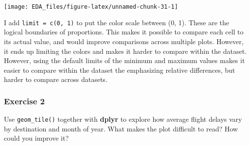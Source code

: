 \documentclass[]{book}
\newenvironment{Shaded}{\begin{snugshade}}{\end{snugshade}}
\newcommand{\DataTypeTok}[1]{\textcolor[rgb]{0.13,0.29,0.53}{#1}}
\newcommand{\DecValTok}[1]{\textcolor[rgb]{0.00,0.00,0.81}{#1}}
\newcommand{\KeywordTok}[1]{\textcolor[rgb]{0.13,0.29,0.53}{\textbf{#1}}}
\newcommand{\NormalTok}[1]{#1}
\newcommand{\OperatorTok}[1]{\textcolor[rgb]{0.81,0.36,0.00}{\textbf{#1}}}
\newcommand{\StringTok}[1]{\textcolor[rgb]{0.31,0.60,0.02}{#1}}
\theoremstyle{definition}
\theoremstyle{definition}
\theoremstyle{definition}
\theoremstyle{remark}
\begin{document}
\begin{Shaded}
\end{Shaded}

\begin{center}\texttt{[image: EDA\_files/figure-latex/unnamed-chunk-31-1]} \end{center}

I add \texttt{limit\ =\ c(0,\ 1)} to put the color scale between (0, 1).
These are the logical boundaries of proportions. This makes it possible
to compare each cell to its actual value, and would improve comparisons
across multiple plots. However, it ends up limiting the colors and makes
it harder to compare within the dataset. However, using the default
limits of the minimum and maximum values makes it easier to compare
within the dataset the emphasizing relative differences, but harder to
compare across datasets.

\hypertarget{exercise-2-10}{%
\subsubsection{Exercise 2}\label{exercise-2-10}}

Use \texttt{geom\_tile()} together with \textbf{dplyr} to explore how
average flight delays vary by destination and month of year. What makes
the plot difficult to read? How could you improve it?
\end{document}
